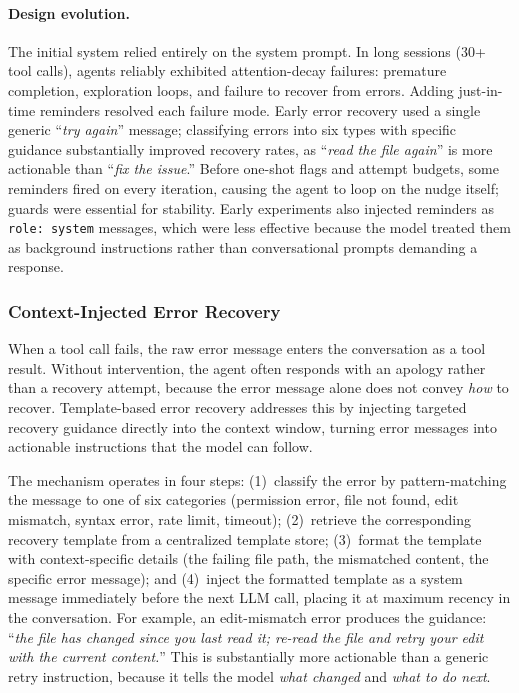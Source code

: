 \paragraph{Design evolution.} The initial system relied entirely on the system prompt. In long sessions (30+ tool calls), agents reliably exhibited attention-decay failures: premature completion, exploration loops, and failure to recover from errors. Adding just-in-time reminders resolved each failure mode. Early error recovery used a single generic ``\emph{try again}'' message; classifying errors into six types with specific guidance substantially improved recovery rates, as ``\emph{read the file again}'' is more actionable than ``\emph{fix the issue}.'' Before one-shot flags and attempt budgets, some reminders fired on every iteration, causing the agent to loop on the nudge itself; guards were essential for stability. Early experiments also injected reminders as \texttt{role:~system} messages, which were less effective because the model treated them as background instructions rather than conversational prompts demanding a response.


\subsubsection{Context-Injected Error Recovery}
\label{sec:error_recovery}

When a tool call fails, the raw error message enters the conversation as a tool result. Without intervention, the agent often responds with an apology rather than a recovery attempt, because the error message alone does not convey \emph{how} to recover. Template-based error recovery addresses this by injecting targeted recovery guidance directly into the context window, turning error messages into actionable instructions that the model can follow.

The mechanism operates in four steps: (1)~classify the error by pattern-matching the message to one of six categories (permission error, file not found, edit mismatch, syntax error, rate limit, timeout); (2)~retrieve the corresponding recovery template from a centralized template store; (3)~format the template with context-specific details (the failing file path, the mismatched content, the specific error message); and (4)~inject the formatted template as a system message immediately before the next LLM call, placing it at maximum recency in the conversation. For example, an edit-mismatch error produces the guidance: ``\emph{the file has changed since you last read it; re-read the file and retry your edit with the current content.}'' This is substantially more actionable than a generic retry instruction, because it tells the model \emph{what changed} and \emph{what to do next}.

